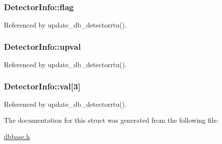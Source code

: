 \hypertarget{structDetectorInfo_a97a917f0d89a2aef284980b3c5c5ea7a}{
\subsubsection[{flag}]{ Detector\-Info\-::flag}}\label{structDetectorInfo_a97a917f0d89a2aef284980b3c5c5ea7a}


Referenced by update\-\_\-db\-\_\-detectorrtu().

\hypertarget{structDetectorInfo_adb7255552b8dfb9eb1506fdd8d6c8105}{
\subsubsection[{upval}]{ Detector\-Info\-::upval}}\label{structDetectorInfo_adb7255552b8dfb9eb1506fdd8d6c8105}


Referenced by update\-\_\-db\-\_\-detectorrtu().

\hypertarget{structDetectorInfo_a413c1a19e7600530e457efbf839df865}{
\subsubsection[{val}]{ Detector\-Info\-::val\mbox{[}3\mbox{]}}}\label{structDetectorInfo_a413c1a19e7600530e457efbf839df865}


Referenced by update\-\_\-db\-\_\-detectorrtu().



The documentation for this struct was generated from the following file\-:\begin{DoxyCompactItemize}
\item 
\hyperlink{dbbase_8h}{dbbase.\-h}\end{DoxyCompactItemize}
